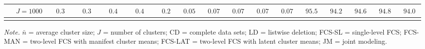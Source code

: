 \begin{sidewaystable}
\begin{threeparttable}
\begin{tabular}{llccccccccccccccc}
 & \nopagebreak $\;J=1000$  & $\phantom{-}0.3\phantom{0}$ & $\phantom{-}0.3\phantom{0}$ & $\phantom{-}0.4\phantom{0}$ & $\phantom{-}0.4\phantom{0}$ & $\phantom{-}0.2\phantom{0}$ & $\phantom{0}0.05\phantom{0}$ & $\phantom{0}0.07\phantom{0}$ & $\phantom{0}0.07\phantom{0}$ & $\phantom{0}0.07\phantom{0}$ & $\phantom{0}0.07\phantom{0}$ & $\phantom{0}95.5\phantom{0}$ & $\phantom{0}94.2\phantom{0}$ & $\phantom{0}94.6\phantom{0}$ & $\phantom{0}94.8\phantom{0}$ & $\phantom{0}94.0\phantom{0}$ \\
[0.5ex]\hline\\[-1.6ex] 
\end{tabular}
\begin{tablenotes}{\footnotesize \textit{Note.} $\bar{n}$ = average cluster size; $J$ = number of clusters; CD = complete data sets; LD = listwise deletion; FCS-SL = single-level FCS; FCS-MAN = two-level FCS with manifest cluster means; FCS-LAT = two-level FCS with latent cluster means; JM = joint modeling.}\end{tablenotes}
\end{threeparttable}
\end{sidewaystable}

